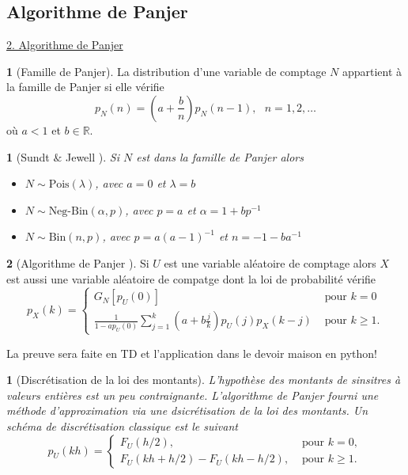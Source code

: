\documentclass[8pt,notheorems]{beamer}
\newcommand{\R}{\mathbb{R}}
\newtheorem{prop}{\translate{Proposition}}
\newtheorem{remark}{\translate{Remark}}
\theoremstyle{definition}
\newtheorem{definition}{\translate{Definition}}
\theoremstyle{example}
\theoremstyle{mystyle}
\theoremstyle{plain}
\begin{document}
\subsection{Algorithme de Panjer}
\begin{frame}[allowframebreaks]
\underline{2. Algorithme de Panjer}\\
\begin{definition}[Famille de Panjer]
La distribution d'une variable de comptage $N$ appartient à la famille de Panjer si elle vérifie
$$
p_N(n) = \left(a+\frac{b}{n}\right)p_{N}(n-1), \text{ }n = 1,2,\ldots
$$
où $a<1$ et $b\in \R$.
\end{definition}
\begin{prop}[Sundt $\&$ Jewell \cite{sundt1981further}]
Si $N$ est dans la famille de Panjer alors
\begin{itemize}
    \item $N\sim\text{Pois}(\lambda)$, avec $a = 0$ et $ \lambda=b$
    \item $N\sim\text{Neg-Bin}(\alpha, p)$, avec $p= a$ et $\alpha = 1+bp^{-1}$
    \item $N\sim \text{Bin}(n,p)$, avec $p = a(a-1)^{-1}$ et $n = -1-ba^{-1}$
\end{itemize}
\end{prop}
\begin{definition}[Algorithme de Panjer \cite{Pa81}]
Si $U$ est une variable aléatoire de comptage alors $X$ est aussi une variable aléatoire de compatge dont la loi de probabilité vérifie
$$
p_X(k)=
\begin{cases}
G_N\left[p_U(0)\right]& \text{ pour }k = 0\\
\frac{1}{1-ap_U(0)}\sum_{j = 1}^{k}\left(a+b\frac{j}{k}\right)p_U(j)p_X(k-j)& \text{ pour }k \geq1.
\end{cases}
$$
\end{definition}
La preuve sera faite en TD et l'application dans le devoir maison en python!
\begin{remark}[Discrétisation de la loi des montants]
L'hypothèse des montants de sinsitres à valeurs entières est un peu contraignante. L'algorithme de Panjer fourni une méthode d'approximation via une dsicrétisation de la loi des montants. Un schéma de discrétisation classique est le suivant
$$
p_U(kh) = \begin{cases}
F_U(h/2),&\text{ pour }k = 0,\\
F_U(kh+h/2)- F_U(kh-h/2),&\text{ pour }k \geq1.
\end{cases}
$$
\end{remark}
\end{frame}
\end{document}
